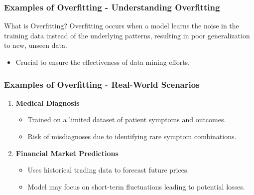 \documentclass[aspectratio=169]{beamer}
\begin{document}
\begin{frame}[fragile]
    \frametitle{Examples of Overfitting - Understanding Overfitting}
    \begin{block}{What is Overfitting?}
        Overfitting occurs when a model learns the noise in the training data instead of the underlying patterns, resulting in poor generalization to new, unseen data. 
    \end{block}
    
    \begin{itemize}
        \item Crucial to ensure the effectiveness of data mining efforts.
    \end{itemize}
\end{frame}

\begin{frame}[fragile]
    \frametitle{Examples of Overfitting - Real-World Scenarios}
    \begin{enumerate}
        \item \textbf{Medical Diagnosis}
            \begin{itemize}
                \item Trained on a limited dataset of patient symptoms and outcomes.
                \item Risk of misdiagnoses due to identifying rare symptom combinations.
            \end{itemize}
        \item \textbf{Financial Market Predictions}
            \begin{itemize}
                \item Uses historical trading data to forecast future prices.
                \item Model may focus on short-term fluctuations leading to potential losses.
            \end{itemize}
    \end{enumerate}
\end{frame}
\end{document}
